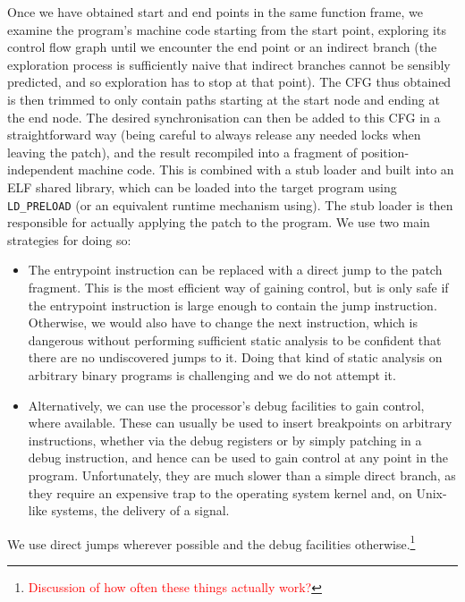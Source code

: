 \documentclass[10pt,twocolumn,preprint,natbib,authoryear]{sigplanconf}
\newcommand{\editorial}[1]{\textcolor{red}{\footnote{\textcolor{red}{#1}}}}
\begin{document}
Once we have obtained start and end points in the same function frame,
we examine the program's machine code starting from the start point,
exploring its control flow graph until we encounter the end point or
an indirect branch (the exploration process is sufficiently naive that
indirect branches cannot be sensibly predicted, and so exploration has
to stop at that point).  The CFG thus obtained is then trimmed to only
contain paths starting at the start node and ending at the end node.
The desired synchronisation can then be added to this CFG in a
straightforward way (being careful to always release any needed locks
when leaving the patch), and the result recompiled into a fragment of
position-independent machine code.  This is combined with a stub
loader and built into an ELF shared library, which can be loaded into
the target program using \verb|LD_PRELOAD| (or an equivalent runtime
mechanism using).  The stub loader is then responsible for actually
applying the patch to the program.  We use two main strategies for
doing so:

\begin{itemize}
\item The entrypoint instruction can be replaced with a direct jump to
  the patch fragment.  This is the most efficient way of gaining
  control, but is only safe if the entrypoint instruction is large
  enough to contain the jump instruction.  Otherwise, we would also
  have to change the next instruction, which is dangerous without
  performing sufficient static analysis to be confident that there are
  no undiscovered jumps to it.  Doing that kind of static analysis on
  arbitrary binary programs is challenging and we do not attempt it.

\item Alternatively, we can use the processor's debug facilities to
  gain control, where available.  These can usually be used to insert
  breakpoints on arbitrary instructions, whether via the debug
  registers\cite{DebugRegisters} or by simply patching in a debug
  instruction, and hence can be used to gain control at any point in
  the program.  Unfortunately, they are much slower than a simple
  direct branch, as they require an expensive trap to the operating
  system kernel and, on Unix-like systems, the delivery of a signal.
\end{itemize}

We use direct jumps wherever possible and the debug facilities
otherwise.\editorial{Discussion of how often these things actually
  work?}
\end{document}
